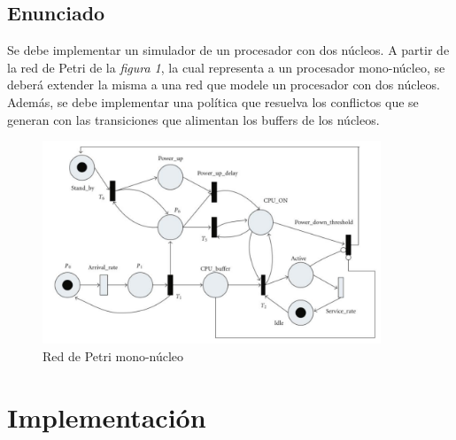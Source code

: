 \documentclass{article}
\begin{document}
    \subsection{Enunciado}
    Se debe implementar un simulador de un procesador con dos núcleos. A partir de la red de
    Petri de la \emph{figura 1}, la cual representa a un procesador mono-núcleo, se deberá 
    extender la misma a una red que modele un procesador con dos núcleos. Además, se debe
    implementar una política que resuelva los conflictos que se generan con las transiciones
    que alimentan los buffers de los núcleos.
    \begin{figure}[H]
        \includegraphics[width=0.9\textwidth, center]{rdp_enun.png}
        \caption{Red de Petri mono-núcleo}
    \end{figure} 
    \newpage
    \section{Implementación}
\end{document}
